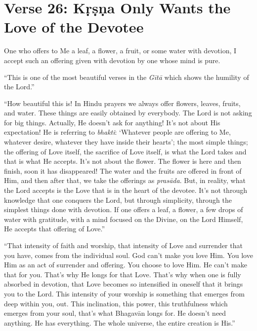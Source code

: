 \section{Verse 26: Kṛṣṇa Only Wants the Love of the Devotee}\label{sec-verse-26-krsna-only-wants-the-love-of-the-devotee}

{One who offers to Me a leaf, a flower, a fruit, or some water with devotion, I accept such an offering given with devotion by one whose mind is pure.}

\enquote{This is one of the most beautiful verses in the \textit{Gītā} which shows the humility of the Lord.}

\enquote{How beautiful this is! In Hindu prayers we always offer flowers, leaves, fruits, and water. These things are easily obtained by everybody. The Lord is not asking for big things. Actually, He doesn’t ask for anything! It’s not about His expectation! He is referring to \textit{bhakti}: \enquote{Whatever people are offering to Me, whatever desire, whatever they have inside their hearts}; the most simple things; the offering of Love itself, the sacrifice of Love itself, is what the Lord takes and that is what He accepts. It’s not about the flower. The flower is here and then finish, soon it has disappeared! The water and the fruits are offered in front of Him, and then after that, we take the offerings as \textit{prasāda}. But, in reality, what the Lord accepts is the Love that is in the heart of the devotee. It’s not through knowledge that one conquers the Lord, but through simplicity, through the simplest things done with devotion. If one offers a leaf, a flower, a few drops of water with gratitude, with a mind focused on the Divine, on the Lord Himself, He accepts that offering of Love.}

\enquote{That intensity of faith and worship, that intensity of Love and surrender that you have, comes from the individual soul. God can’t make you love Him. You love Him as an act of surrender and offering. You choose to love Him. He can’t make that for you. That’s why He longs for that Love. That’s why when one is fully absorbed in devotion, that Love becomes so intensified in oneself that it brings you to the Lord. This intensity of your worship is something that emerges from deep within you, out. This inclination, this power, this truthfulness which emerges from your soul, that’s what Bhagavān longs for. He doesn’t need anything. He has everything. The whole universe, the entire creation is His.}

